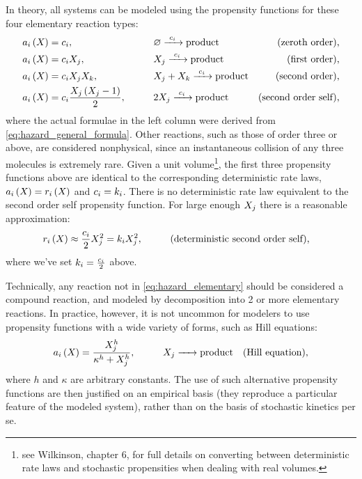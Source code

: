 In theory, all systems can be modeled using the propensity functions for these four elementary reaction types:
\begin{equation}\label{eq:hazard_elementary}
    \begin{aligned}
        \haz &= \constoch, &\qquad & \varnothing \ce{->[\constoch]} \textrm{product} & \textrm{(zeroth order),} \\
%
        \haz &= \constoch \sps, &\qquad & \sps \ce{->[\constoch]} \textrm{product} & \textrm{(first order),} \\
%
        \haz &= \constoch \spsx{\spsi} \spsx{\spsj}, &\qquad & \spsx{\spsi} + \spsx{\spsj} \ce{->[\constoch]} \textrm{product} & \textrm{(second order),} \\
%
        \haz &= \constoch \frac{\sps \left( \sps - 1 \right)}{2}, &\qquad & 2 \sps \ce{->[\constoch]} \textrm{product} & \textrm{(second order self),}
    \end{aligned}
\end{equation}
where the actual formulae in the left column were derived from \eqref{eq:hazard_general_formula}. Other reactions, such as those of order three or above, are considered nonphysical, since an instantaneous collision of any three molecules is extremely rare. Given a unit volume\footnote{see Wilkinson\supercite{Wilkinson:2012tt}, chapter 6, for full details on converting between deterministic rate laws and stochastic propensities when dealing with real volumes.}, the first three propensity functions above are identical to the corresponding deterministic rate laws, \ie $a_{i} \left( X_{} \right) = r_{i} \left( X_{} \right)$ and $c_{i} = k_{i}$. There is no deterministic rate law equivalent to the second order self propensity function. For large enough $X_{j}$ there is a reasonable approximation:
\begin{equation}\label{eq:deterministic_second_order_self}
    \begin{aligned}
        r_{i} \left( X_{} \right) \approx  \frac{c_{i}}{2} X_{j}^{2} = k_{i} X_{j}^{2}, &\qquad && \textrm{(deterministic second order self),}
    \end{aligned}
\end{equation}
where we've set $k_{i} = \frac{c_{i}}{2}$ above.

Technically, any reaction not in \eqref{eq:hazard_elementary} should be considered a compound reaction, and modeled by decomposition into 2 or more elementary reactions. In practice, however, it is not uncommon for modelers to use propensity functions with a wide variety of forms, such as Hill equations:
 \begin{equation*}
     \begin{aligned}
        \haz = \frac{\sps^{h}}{\kappa^{h} + \sps^h}, &\qquad & \sps \ce{->} \textrm{product} && \textrm{(Hill equation),} \\
    \end{aligned}
 \end{equation*}
 where $h$ and $\kappa$ are arbitrary constants. The use of such alternative propensity functions are then justified on an empirical basis (\eg they reproduce a particular feature of the modeled system), rather than on the basis of stochastic kinetics per se\supercite{Gillespie:1992wf}.

